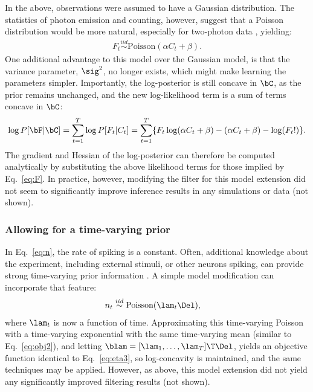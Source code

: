 In the above, observations were assumed to have a Gaussian distribution.  The statistics of photon emission and counting, however, suggest that a Poisson distribution would be more natural, especially for two-photon data \cite{SjulsonMiesenbock07}, yielding:
\begin{align} \label{eq:poiss}
	F_t \overset{iid}{\sim}\text{Poisson}(\alpha C_t + \beta).
\end{align}
One additional advantage to this model over the Gaussian model, is that the variance parameter, $\sig^2$, no longer exists, which might make learning the parameters simpler.  Importantly, the log-posterior is still concave in $\bC$, as
the prior remains unchanged, and the new log-likelihood term is a sum of terms concave in $\bC$:
\begin{align}
	\log P[\bF | \bC] = \sum_{t=1}^T \log P[F_t | C_t ] = \sum_{t=1}^T \{F_t \log (\alpha C_t + \beta) -(\alpha C_t + \beta) - \log(F_t !)\}.
\end{align}
The gradient and Hessian of the log-posterior can therefore be computed analytically by substituting the above likelihood terms for those implied by Eq.~\eqref{eq:F}.  In practice, however, modifying the filter for this model extension did not seem to significantly improve inference results in any simulations or data (not shown).

\subsubsection{Allowing for a time-varying prior}

In Eq.~\eqref{eq:n}, the rate of spiking is a constant.  Often, additional knowledge about the experiment, including external stimuli, or other neurons spiking, can provide strong time-varying prior information \cite{VogelsteinPaninski09}.  A simple model modification can incorporate that feature:
\begin{align}
	n_t &\overset{iid}{\sim} \text{Poisson}(\lam_t \Del),
\end{align}
where $\lam_t$ is now a function of time.  Approximating this time-varying Poisson with a time-varying exponential with the same time-varying mean (similar to Eq.~\eqref{eq:obj2}), and letting $\blam = [\lam_1, \ldots, \lam_T]\T \Del$, yields an objective function identical to Eq.~\eqref{eq:eta3}, so log-concavity is maintained, and the same techniques may be applied.  However, as above, this model extension did not yield any significantly improved filtering results (not shown).

